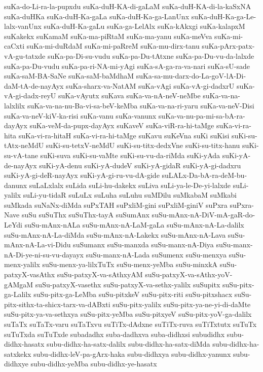 {suKa-do-Li-ra-la-pupxdu
suKa-duH-KA-di-gaLaM
suKa-duH-KA-di-la-kaSxNA
suKa-duHKa
suKa-duH-Ka-gaLa
suKa-duH-Ka-ga-LanUnx
suKa-duH-Ka-ga-Le-lalx-vanUnx
suKa-duH-Ka-gaLu
suKa-ga-LelAlx
suKa-kAkxgi
suKa-kalapxM
suKakekx
suKamaM
suKa-ma-piRtaM
suKa-ma-yanu
suKa-meVva
suKa-mi-caCxti
suKa-mi-duRdaM
suKa-mi-paRreM
suKa-mu-dirx-tanu
suKa-pArx-patx-vA-gu-tatxde
suKa-pa-Di-su-vudu
suKa-pa-Du-tAtxne
suKa-pa-Du-vu-da-lalxde
suKa-pa-Du-vudu
suKa-pa-ri-NA-mi-yAgi
suKa-sA-ga-ra-va-nari
suKa-sU-sade
suKa-saM-BA-SaNe
suKa-saM-baMdhaM
suKa-sa-mu-darx-do-La-goV-lA-Di-daM-tA-de-nayAyx
suKa-sharx-va-NatAM
suKa-vAgi
suKa-vA-gi-dadxrU
suKa-vA-gi-dadx-reyU
suKa-vAyutx
suKava
suKa-va-nA-neV-neMbe
suKa-va-na-lalxlilx
suKa-va-na-nu-Ba-vi-sa-beV-keMba
suKa-va-na-ri-yaru
suKa-va-neV-Disi
suKa-va-neV-kiV-ka-risi
suKa-vanu
suKa-vanunx
suKa-va-nu-pa-mi-sa-bA-ra-dayAyx
suKa-veM-da-pupx-dayAyx
suKaveV
suKa-viR-ra-hi-taMge
suKa-vi-ra-hita
suKa-vi-ra-hitaH
suKa-vi-ra-hi-taMge
suKavu
suKeVna
suKi
suKisi
suKi-su-tAtx-neMdU
suKi-su-tetxV-neMdU
suKi-su-titx-dedxVne
suKi-su-titx-hanu
suKi-su-vA-tane
suKi-suva
suKi-su-vaMte
suKi-su-vu-da-riMda
suKi-yAda
suKi-yA-de-nayAyx
suKi-yA-denu
suKi-yA-dudeV
suKi-yA-gidaR
suKi-yA-gi-dadxru
suKi-yA-gi-deR-nayAyx
suKi-yA-gi-ru-vu-dA-gide
suLALx-Da-bA-ra-deM-bu-danunx
suLaLxlalx
suLida
suLi-hu-dakekx
suLiva
suLi-ya-le-De-yi-lalxde
suLi-yalilx
suLi-yu-tidaR
suLuLx
suLuha
suLuhu
suMDilu
suMkabaM
suMkabi
suMkada
suNaNx-diMda
suPxTAH
suPxliM-gini
suPxliM-giniV
suPxra
suPxra-Nave
suSu
suSuThx
suSuThx-tayA
suSumAnx
suSu-mAnx-nA-DiV-mA-gaR-do-LeYdi
suSu-mAnx-nALa
suSu-mAnx-nA-LaM-gaLa
suSu-mAnx-nA-La-dalilx
suSu-mAnx-nA-La-diMda
suSu-mAnx-nA-Lakekx
suSu-mAnx-nA-Lava
suSu-mAnx-nA-La-vi-Didu
suSumanx
suSu-manxda
suSu-manx-nA-Diya
suSu-manx-nA-Di-ye-ni-su-vu-dayayx
suSu-manx-nA-Lada
suSumenx
suSu-menxya
suSu-menx-yalilx
suSu-menx-ya-lilxTuTx
suSu-menx-yeMba
suSu-minxkA
suSu-patxyX-vasAthx
suSu-patxyX-va-sAthxyAM
suSu-patxyX-va-sAthx-yoV-gAMgaM
suSu-patxyX-vasethx
suSu-patxyX-va-sethx-yalilx
suSupitx
suSu-pitx-ga-Lalilx
suSu-pitx-ga-LeMba
suSu-pitxkeV
suSu-pitx-riti
suSu-pitxshacx
suSu-pitx-sithx-ta-shicx-tarx-va-dABxti
suSu-pitx-yalilx
suSu-pitx-ya-ne-yi-di-daMte
suSu-pitx-ya-va-sethxya
suSu-pitx-yeMba
suSu-pitxyeV
suSu-pitx-yoV-ga-dalilx
suTaTx
suTaTx-varu
suTaTxvu
suTiTx-dAdxne
suTiTx-ruva
suTiTxtutx
suTuTx
suTuTxda
suTuTxde
subadadhx
suba-dadhxva
suba-didhxsi
subudidhx
subu-didhx-hasatx
subu-didhx-ha-satx-dalilx
subu-didhx-ha-satx-diMda
subu-didhx-ha-satxkekx
subu-didhx-leV-pa-gArx-haka
subu-didhxya
subu-didhx-yanunx
subu-didhxye
subu-didhx-yeMba
subu-didhx-ye-hasatx
}
